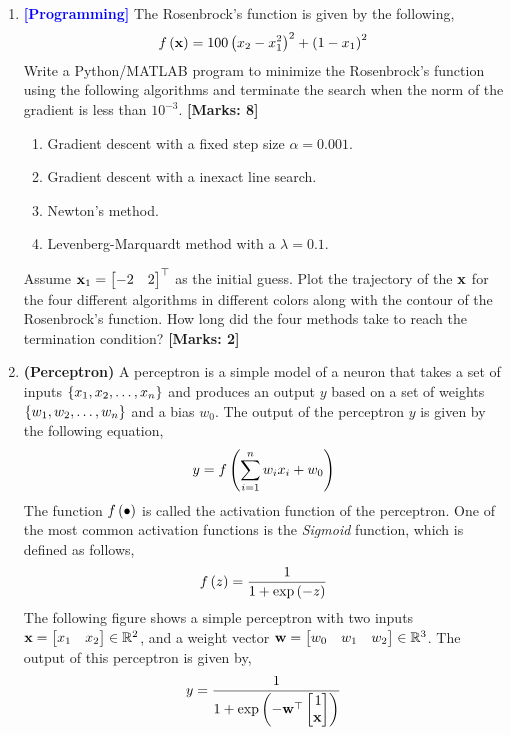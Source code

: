 \documentclass[12pt]{article}
\def\mf{\ensuremath\mathbf}
\def\mb{\ensuremath\mathbb}
\def\lp{\ensuremath\left(}
\def\rp{\ensuremath\right)}
\def\lc{\ensuremath\left\{}
\def\rc{\ensuremath\right\}}
\def\bmx{\ensuremath\begin{bmatrix*}[r]}
\def\emx{\ensuremath\end{bmatrix*}}
\newcommand{\ct}[1]{\lp #1\rp}
\begin{document}
\begin{enumerate}
    \item \textcolor{blue}{\textbf{[Programming]}} The Rosenbrock's function is given by the following,
    \[ f\ct{\mf{x}} = 100\ct{x_2 - x_1^2}^2 + \ct{1 - x_1}^2 \]
    Write a Python/MATLAB program to minimize the Rosenbrock's function using the following algorithms and terminate the search when the norm of the gradient is less than $10^{-3}$. \textbf{[Marks: 8]}
    \begin{enumerate}
        \item Gradient descent with a fixed step size $\alpha = 0.001$.
        \item Gradient descent with a inexact line search.
        \item Newton's method.
        \item Levenberg-Marquardt method with a $\lambda = 0.1$.
    \end{enumerate}
    Assume $\mf{x}_1 = \bmx -2 & 2\emx^\top$ as the initial guess. Plot the trajectory of the $\mf{x}$ for the four different algorithms in different colors along with the contour of the Rosenbrock's function. How long did the four methods take to reach the termination condition? \textbf{[Marks: 2]}
    
    \item \textbf{(Perceptron)} A perceptron is a simple model of a neuron that takes a set of inputs $\lc x_1, x_2, \ldots, x_n\rc$ and produces an output $y$ based on a set of weights $\lc w_1, w_2, \ldots, w_n\rc$ and a bias $w_0$. The output of the perceptron $y$ is given by the following equation,
    \[ y = f\ct{\sum_{i=1}^n w_i x_i + w_0} \]
    The function $f\ct{\bullet}$ is called the activation function of the perceptron. One of the most common activation functions is the \textit{Sigmoid} function, which is defined as follows,
    \[ f\ct{z} = \frac{1}{1 + \exp\ct{-z}} \]
    The following figure shows a simple perceptron with two inputs $\mf{x} = \bmx x_1 & x_2\emx \in \mb{R}^2$, and a weight vector $\mf{w} = \bmx w_0 & w_1 & w_2 \emx \in \mb{R}^3$. The output of this perceptron is given by,
    \[ y = \frac{1}{1 + \exp\ct{-\mf{w}^\top \bmx 1 \\ \mf{x}\emx}} \]
    \begin{center}
        \begin{tikzpicture}[
            neuron/.style={circle, draw, minimum size=1cm},
            connection/.style={-stealth, thick},
            ]
        

\end{tikzpicture}
\end{center}
\end{enumerate}
\end{document}

